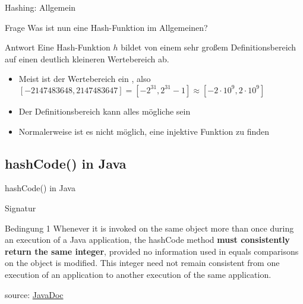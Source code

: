 \documentclass[usepdftitle=false,hyperref={pdfpagelabels=false}]{beamer}
\begin{document}
\begin{frame}{Hashing: Allgemein}
    \begin{block}{Frage}
        Was ist nun eine Hash-Funktion im Allgemeinen?
    \end{block}

    \begin{block}{Antwort}
        Eine Hash-Funktion $h$ bildet von einem sehr großem 
        Definitionsbereich auf einen deutlich kleineren Wertebereich
        ab.
    \end{block}
    
    \pause

    \begin{itemize}[<+->]
        \item Meist ist der Wertebereich ein , also $[-2147483648, 2147483647] = [-2^{31},2^{31}-1] \approx [-2 \cdot 10^9, 2 \cdot 10^9]$
        \item Der Definitionsbereich kann alles mögliche sein
        \item Normalerweise ist es nicht möglich, eine injektive Funktion zu finden
    \end{itemize}
\end{frame}

\subsection{hashCode() in Java}
\begin{frame}{hashCode() in Java}
    \begin{block}{Signatur}
    \end{block}

    \pause

    \begin{block}{Bedingung 1}
        Whenever it is invoked on the same object more than once 
        during an execution of a Java application, the hashCode 
        method \textbf{must consistently return the same integer}, 
        provided no information used in equals comparisons on the 
        object is modified. This integer need not remain consistent 
        from one execution of an application to another execution of 
        the same application.
    \end{block}
    {\tiny source: \href{http://docs.oracle.com/javase/7/docs/api/java/lang/Object.html\#hashCode()}{JavaDoc}}
\end{frame}
\end{document}
